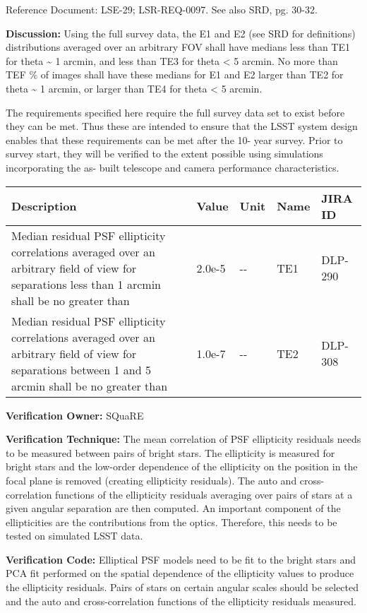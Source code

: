 Reference Document: LSE-29; LSR-REQ-0097. See also SRD, pg. 30-32.

\textbf{Discussion:} Using the full survey data, the E1 and E2 (see SRD
for definitions) distributions averaged over an arbitrary FOV shall have
medians less than TE1 for theta \textasciitilde{} 1 arcmin, and less
than TE3 for theta \textless{} 5 arcmin. No more than TEF \% of images
shall have these medians for E1 and E2 larger than TE2 for theta
\textasciitilde{} 1 arcmin, or larger than TE4 for theta \textless{} 5
arcmin.

The requirements specified here require the full survey data set to
exist before they can be met. Thus these are intended to ensure that the
LSST system design enables that these requirements can be met after the
10- year survey. Prior to survey start, they will be verified to the
extent possible using simulations incorporating the as- built telescope
and camera performance characteristics.

\begin{longtable}[]{@{}lllll@{}}
\toprule
Description & Value & Unit & Name & JIRA ID\tabularnewline
\midrule
\endhead
Median residual PSF ellipticity correlations averaged over an arbitrary
field of view for separations less than 1 arcmin shall be no greater
than & 2.0e-5 & -\/- & TE1 & DLP-290\tabularnewline
Median residual PSF ellipticity correlations averaged over an arbitrary
field of view for separations between 1 and 5 arcmin shall be no greater
than & 1.0e-7 & -\/- & TE2 & DLP-308\tabularnewline
\bottomrule
\end{longtable}

\textbf{Verification Owner:} SQuaRE

\textbf{Verification Technique:} The mean correlation of PSF ellipticity
residuals needs to be measured between pairs of bright stars. The
ellipticity is measured for bright stars and the low-order dependence of
the ellipticity on the position in the focal plane is removed (creating
ellipticity residuals). The auto and cross-correlation functions of the
ellipticity residuals averaging over pairs of stars at a given angular
separation are then computed. An important component of the
ellipticities are the contributions from the optics. Therefore, this
needs to be tested on simulated LSST data.

\textbf{Verification Code:} Elliptical PSF models need to be fit to the
bright stars and PCA fit performed on the spatial dependence of the
ellipticity values to produce the ellipticity residuals. Pairs of stars
on certain angular scales should be selected and the auto and
cross-correlation functions of the ellipticity residuals measured.

